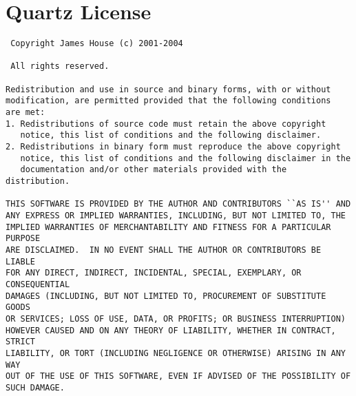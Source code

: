 \documentclass{InsightBook}
\begin{document}
\section{Quartz License}
\begin{verbatim}
 Copyright James House (c) 2001-2004

 All rights reserved.

Redistribution and use in source and binary forms, with or without
modification, are permitted provided that the following conditions
are met:
1. Redistributions of source code must retain the above copyright
   notice, this list of conditions and the following disclaimer.
2. Redistributions in binary form must reproduce the above copyright
   notice, this list of conditions and the following disclaimer in the
   documentation and/or other materials provided with the distribution.

THIS SOFTWARE IS PROVIDED BY THE AUTHOR AND CONTRIBUTORS ``AS IS'' AND
ANY EXPRESS OR IMPLIED WARRANTIES, INCLUDING, BUT NOT LIMITED TO, THE
IMPLIED WARRANTIES OF MERCHANTABILITY AND FITNESS FOR A PARTICULAR PURPOSE
ARE DISCLAIMED.  IN NO EVENT SHALL THE AUTHOR OR CONTRIBUTORS BE LIABLE
FOR ANY DIRECT, INDIRECT, INCIDENTAL, SPECIAL, EXEMPLARY, OR CONSEQUENTIAL
DAMAGES (INCLUDING, BUT NOT LIMITED TO, PROCUREMENT OF SUBSTITUTE GOODS
OR SERVICES; LOSS OF USE, DATA, OR PROFITS; OR BUSINESS INTERRUPTION)
HOWEVER CAUSED AND ON ANY THEORY OF LIABILITY, WHETHER IN CONTRACT, STRICT
LIABILITY, OR TORT (INCLUDING NEGLIGENCE OR OTHERWISE) ARISING IN ANY WAY
OUT OF THE USE OF THIS SOFTWARE, EVEN IF ADVISED OF THE POSSIBILITY OF
SUCH DAMAGE.
\end{verbatim}

                
\end{document}
